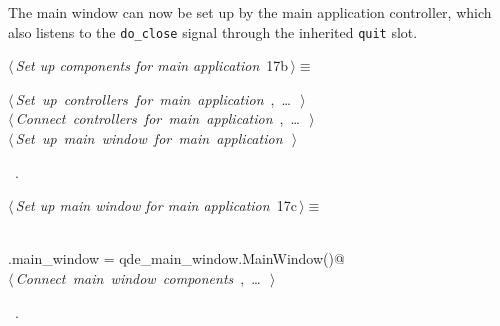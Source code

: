 \documentclass[
    a4paper,      %
    10pt,         %
    openright,    %
    notitlepage,  %
    parskip=half, %
]{scrreprt}       %
\theoremstyle{definition}                    %
\begin{document}
The main window can now be set up by the main application controller, which also
listens to the \verb=do_close= signal through the inherited \verb=quit= slot.

\begin{flushleft} \small
\begin{minipage}{\linewidth}\label{scrap8}\raggedright\small
{} $\langle\,${\itshape Set up components for main application}\nobreak\ {\footnotesize {17b}}$\,\rangle\equiv$
\vspace{-1exm}
\begin{list}{}{} \item
\mbox{}\lstinline@@\hbox{$\langle\,${\itshape Set up controllers for main application}\nobreak\ {\footnotesize {}, \ldots\ }$\,\rangle$}\lstinline@@\\
\mbox{}\lstinline@@\hbox{$\langle\,${\itshape Connect controllers for main application}\nobreak\ {\footnotesize {}, \ldots\ }$\,\rangle$}\lstinline@@\\
\mbox{}\lstinline@@\hbox{$\langle\,${\itshape Set up main window for main application}\nobreak\ {\footnotesize {}}$\,\rangle$}\lstinline@@{\NWsep}
\end{list}
\vspace{-1.5ex}
\footnotesize
\begin{list}{}{\setlength{\itemsep}{-\parsep}\setlength{\itemindent}{-\leftmargin}}
\item \NWtxtMacroRefIn\ .

\item{}
\end{list}
\end{minipage}\vspace{4ex}
\end{flushleft}
\begin{flushleft} \small
\begin{minipage}{\linewidth}\label{scrap9}\raggedright\small
{} $\langle\,${\itshape Set up main window for main application}\nobreak\ {\footnotesize {17c}}$\,\rangle\equiv$
\vspace{-1exm}
\begin{list}{}{} \item
\mbox{}\lstinline@@\\
\mbox{}\lstinline@self.main_window = qde_main_window.MainWindow()@\\
\mbox{}\lstinline@@\hbox{$\langle\,${\itshape Connect main window components}\nobreak\ {\footnotesize {}, \ldots\ }$\,\rangle$}\lstinline@@{\NWsep}
\end{list}
\vspace{-1.5ex}
\footnotesize
\begin{list}{}{\setlength{\itemsep}{-\parsep}\setlength{\itemindent}{-\leftmargin}}
\item \NWtxtMacroRefIn\ .

\item{}
\end{list}
\end{minipage}\vspace{4ex}
\end{flushleft}
\end{document}
